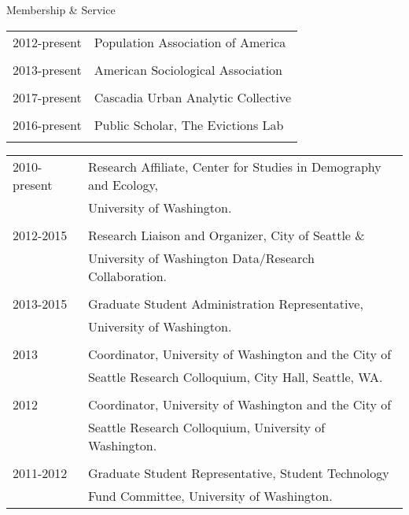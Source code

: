 \documentclass{resume} %
\begin{document}
\begin{rSection}{Membership \& Service}
\vspace{5mm}
\begin{tabular}{ @{} >{}l @{\hspace{6ex}} l }

2012-present	& Population Association of America\\\\

2013-present	& American Sociological Association\\\\

2017-present	& Cascadia Urban Analytic Collective\\\\

2016-present	& Public Scholar, The Evictions Lab\\\\
\end{tabular}

\begin{tabular}{ @{} >{}l @{\hspace{6ex}} l }
2010-present	& Research Affiliate, Center for Studies in Demography and Ecology,\\
				& University of Washington.\\\\

2012-2015		& Research Liaison and Organizer, City of Seattle \&\\
				& University of Washington Data/Research Collaboration.\\\\

2013-2015		& Graduate Student Administration Representative,\\
				& University of Washington.\\\\

2013			& Coordinator, University of Washington and the City of\\
				& Seattle Research Colloquium, City Hall, Seattle, WA.\\\\

2012			& Coordinator, University of Washington and the City of\\
				& Seattle Research Colloquium, University of Washington.\\\\

2011-2012		& Graduate Student Representative, Student Technology\\
				& Fund Committee, University of Washington.
\end{tabular}
\vspace{5mm}
\end{rSection}
\end{document}
